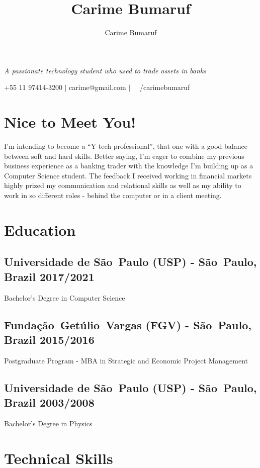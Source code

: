 \documentclass{article}
\makeatletter
\renewcommand{\maketitle}{
    \begin{raggedleft}
    {\Huge\bfseries\theauthor}

    \vspace{.25em}
    \large{\emph{A passionate technology student who used to trade assets in banks}}\

    \vspace{.25em}
    +55 11 97414-3200 $|$ carime@gmail.com $|$  \faLinkedin\  \ /carimebumaruf

    \end{raggedleft}
}
\makeatother
\begin{document}
\title{Carime Bumaruf}
\author{Carime Bumaruf}

\maketitle

\vspace{2.5mm} %

\section{Nice to Meet You!}
\begin{spacing}{1.1}

    I'm intending to become a ``Y tech professional'', that one with a good balance between
    soft and hard skills. Better saying, I'm eager to combine my previous business 
    experience as a banking trader with the knowledge I'm building up as a Computer 
    Science student.   
    The feedback I received working in financial markets highly prized my communication 
    and relational skills as well as my ability to work in so different roles - behind 
    the computer or in a client meeting.

\end{spacing}

\section{Education}
\subsection{Universidade de S\~ao\ Paulo (USP) - S\~ao\ Paulo, Brazil \hfill 2017/2021}
Bachelor's Degree in Computer Science

\subsection{Funda\c{c}\~ao\ Get\'ulio\ Vargas (FGV) - S\~ao\ Paulo, Brazil \hfill 2015/2016}
Postgraduate Program - MBA in Strategic and Economic Project Management

\subsection{Universidade de S\~ao\ Paulo (USP) - S\~ao\ Paulo, Brazil \hfill 2003/2008}
Bachelor's Degree in Physics

\section{Technical Skills}
\end{document}
